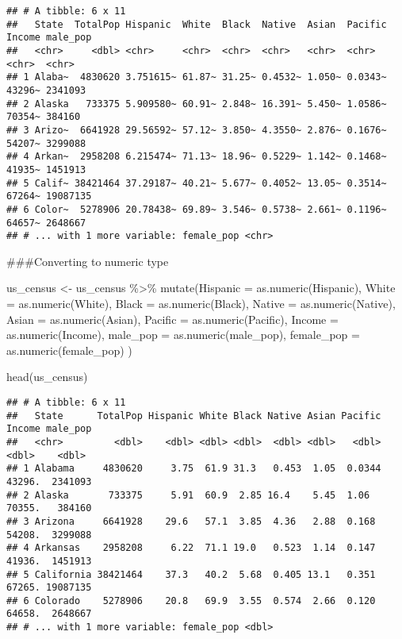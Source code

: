\documentclass[
]{article}
\newenvironment{Shaded}{\begin{snugshade}}{\end{snugshade}}
\newcommand{\AttributeTok}[1]{\textcolor[rgb]{0.77,0.63,0.00}{#1}}
\newcommand{\FunctionTok}[1]{\textcolor[rgb]{0.00,0.00,0.00}{#1}}
\newcommand{\NormalTok}[1]{#1}
\newcommand{\OtherTok}[1]{\textcolor[rgb]{0.56,0.35,0.01}{#1}}
\newcommand{\SpecialCharTok}[1]{\textcolor[rgb]{0.00,0.00,0.00}{#1}}
\begin{document}
\begin{verbatim}
## # A tibble: 6 x 11
##   State  TotalPop Hispanic  White  Black  Native  Asian  Pacific Income male_pop
##   <chr>     <dbl> <chr>     <chr>  <chr>  <chr>   <chr>  <chr>   <chr>  <chr>   
## 1 Alaba~  4830620 3.751615~ 61.87~ 31.25~ 0.4532~ 1.050~ 0.0343~ 43296~ 2341093 
## 2 Alaska   733375 5.909580~ 60.91~ 2.848~ 16.391~ 5.450~ 1.0586~ 70354~ 384160  
## 3 Arizo~  6641928 29.56592~ 57.12~ 3.850~ 4.3550~ 2.876~ 0.1676~ 54207~ 3299088 
## 4 Arkan~  2958208 6.215474~ 71.13~ 18.96~ 0.5229~ 1.142~ 0.1468~ 41935~ 1451913 
## 5 Calif~ 38421464 37.29187~ 40.21~ 5.677~ 0.4052~ 13.05~ 0.3514~ 67264~ 19087135
## 6 Color~  5278906 20.78438~ 69.89~ 3.546~ 0.5738~ 2.661~ 0.1196~ 64657~ 2648667 
## # ... with 1 more variable: female_pop <chr>
\end{verbatim}

\#\#\#Converting to numeric type

\begin{Shaded}
\begin{Highlighting}[]
\NormalTok{us\_census }\OtherTok{\textless{}{-}}\NormalTok{ us\_census }\SpecialCharTok{\%\textgreater{}\%}
  \FunctionTok{mutate}\NormalTok{(}\AttributeTok{Hispanic =} \FunctionTok{as.numeric}\NormalTok{(Hispanic),}
         \AttributeTok{White =} \FunctionTok{as.numeric}\NormalTok{(White),}
         \AttributeTok{Black =} \FunctionTok{as.numeric}\NormalTok{(Black),}
         \AttributeTok{Native =} \FunctionTok{as.numeric}\NormalTok{(Native),}
         \AttributeTok{Asian =} \FunctionTok{as.numeric}\NormalTok{(Asian),}
         \AttributeTok{Pacific =} \FunctionTok{as.numeric}\NormalTok{(Pacific),}
         \AttributeTok{Income =} \FunctionTok{as.numeric}\NormalTok{(Income),}
         \AttributeTok{male\_pop =} \FunctionTok{as.numeric}\NormalTok{(male\_pop),}
      \AttributeTok{female\_pop =} 
        \FunctionTok{as.numeric}\NormalTok{(female\_pop)}
\NormalTok{            )}

\FunctionTok{head}\NormalTok{(us\_census)}
\end{Highlighting}
\end{Shaded}

\begin{verbatim}
## # A tibble: 6 x 11
##   State      TotalPop Hispanic White Black Native Asian Pacific Income male_pop
##   <chr>         <dbl>    <dbl> <dbl> <dbl>  <dbl> <dbl>   <dbl>  <dbl>    <dbl>
## 1 Alabama     4830620     3.75  61.9 31.3   0.453  1.05  0.0344 43296.  2341093
## 2 Alaska       733375     5.91  60.9  2.85 16.4    5.45  1.06   70355.   384160
## 3 Arizona     6641928    29.6   57.1  3.85  4.36   2.88  0.168  54208.  3299088
## 4 Arkansas    2958208     6.22  71.1 19.0   0.523  1.14  0.147  41936.  1451913
## 5 California 38421464    37.3   40.2  5.68  0.405 13.1   0.351  67265. 19087135
## 6 Colorado    5278906    20.8   69.9  3.55  0.574  2.66  0.120  64658.  2648667
## # ... with 1 more variable: female_pop <dbl>
\end{verbatim}
\end{document}
